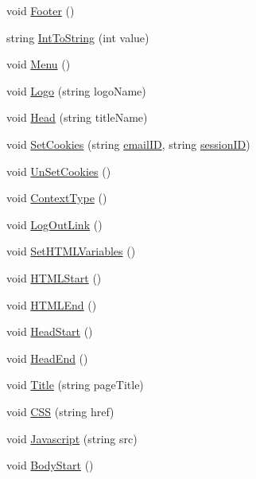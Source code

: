 \begin{DoxyCompactItemize}
void \hyperlink{classInputDetail_acbc05b1bc6a371cf0a52222cc95e467d}{Footer} ()
\item 
string \hyperlink{classInputDetail_ad0a78d7c864bcccf7813a526d59573be}{Int\-To\-String} (int value)
\item 
void \hyperlink{classPageLayout_a49af1dca286bbee9432192a7b3c00332}{Menu} ()
\item 
void \hyperlink{classPageLayout_ae60235c6af48e3ebbc6343d02456da0c}{Logo} (string logo\-Name)
\item 
void \hyperlink{classPageLayout_ae50907d56f0ba7a85f7ccfdeafa45bcc}{Head} (string title\-Name)
\item 
void \hyperlink{classPageLayout_a449b4dde24cf3dc10299dc3c7bfc0e9c}{Set\-Cookies} (string \hyperlink{classLogin_a3470a140651dd1afafe29f4dde99905d}{email\-I\-D}, string \hyperlink{classPageLayout_ab796c4a12a3f9c089881085e508e2a1c}{session\-I\-D})
\item 
void \hyperlink{classPageLayout_a279763d617259e21afbf7bc8d65a3c57}{Un\-Set\-Cookies} ()
\item 
void \hyperlink{classPageLayout_a9884173383d3e9b91e5b4ba6a619caa9}{Context\-Type} ()
\item 
void \hyperlink{classPageLayout_a060621cba0434c5d60dff14b2ee1584b}{Log\-Out\-Link} ()
\item 
void \hyperlink{classPageStructureMaker_aaf78d67380c400cc0057c6519276f721}{Set\-H\-T\-M\-L\-Variables} ()
\item 
void \hyperlink{classPageStructureMaker_ad25d6abc983253567e2370882fc1b407}{H\-T\-M\-L\-Start} ()
\item 
void \hyperlink{classPageStructureMaker_a63b877af1c2c8de8332e3f7eb4c2c2b0}{H\-T\-M\-L\-End} ()
\item 
void \hyperlink{classPageStructureMaker_a14312134cb108f91f2e6d9cbd6916e97}{Head\-Start} ()
\item 
void \hyperlink{classPageStructureMaker_ad64115d592b0989b422a93f85278186e}{Head\-End} ()
\item 
void \hyperlink{classPageStructureMaker_a81e902ddc0c0287df1ba0f614a3774d6}{Title} (string page\-Title)
\item 
void \hyperlink{classPageStructureMaker_aacdb11817f8ab246bc59c552e04e862d}{C\-S\-S} (string href)
\item 
void \hyperlink{classPageStructureMaker_ac221d1169f4dbcef6adb00938919193d}{Javascript} (string src)
\item 
void \hyperlink{classPageStructureMaker_ab7a645675166f34fac99f1ed8feb7c27}{Body\-Start} ()

\end{DoxyCompactItemize}
